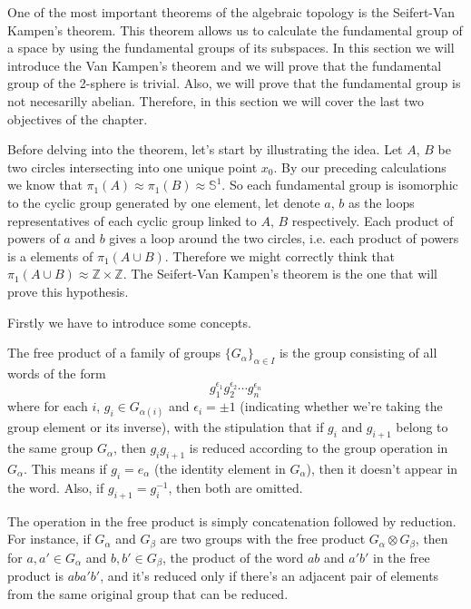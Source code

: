 \documentclass[12pt]{article}
\begin{document}
One of the most important theorems of the algebraic topology is the Seifert-Van Kampen's theorem. This theorem allows us to calculate the fundamental group of a space by using the fundamental groups of its subspaces. In this section we will introduce the Van Kampen's theorem and we will prove that the fundamental group of the 2-sphere is trivial. Also, we will prove that the fundamental group is not necesarilly abelian. Therefore, in this section we will cover the last two objectives of the chapter.

Before delving into the theorem, let's start by illustrating the idea. Let \(A\), \(B\) be two circles intersecting into one unique point \(x_0\). By our preceding calculations we know that \(\pi_1(A) \approx \pi_1(B) \approx \mathbb{S}^1\). So each fundamental group is isomorphic to the cyclic group generated by one element, let denote \(a\), \(b\) as the loops representatives of each cyclic group linked to \(A\), \(B\) respectively. Each product of powers of \(a\) and \(b\) gives a loop around the two circles, i.e. each product of powers is a elements of \(\pi_1(A \cup B)\). Therefore we might correctly think that \(\pi_1(A \cup B) \approx \mathbb{Z} \times \mathbb{Z}\). The Seifert-Van Kampen's theorem is the one that will prove this hypothesis.

Firstly we have to introduce some concepts. 

\begin{definition}
	The free product of a family of groups \( \{ G_\alpha \}_{\alpha \in I} \) is the group consisting of all words of the form 
	\[ g_1^{\epsilon_1} g_2^{\epsilon_2} \cdots g_n^{\epsilon_n} \]
	where for each \( i \), \( g_i \in G_{\alpha(i)} \) and \( \epsilon_i = \pm 1 \) (indicating whether we're taking the group element or its inverse), with the stipulation that if \( g_i \) and \( g_{i+1} \) belong to the same group \( G_\alpha \), then \( g_i g_{i+1} \) is reduced according to the group operation in \( G_\alpha \). This means if \( g_i = e_{\alpha} \) (the identity element in \( G_\alpha \)), then it doesn't appear in the word. Also, if \( g_{i+1} = g_i^{-1} \), then both are omitted.
\end{definition}

The operation in the free product is simply concatenation followed by reduction. For instance, if \( G_\alpha \) and \( G_\beta \) are two groups with the free product \( G_\alpha \otimes G_\beta \), then for \( a, a' \in G_\alpha \) and \( b, b' \in G_\beta \), the product of the word \( ab \) and \( a'b' \) in the free product is \( aba'b' \), and it's reduced only if there's an adjacent pair of elements from the same original group that can be reduced.
\end{document}
